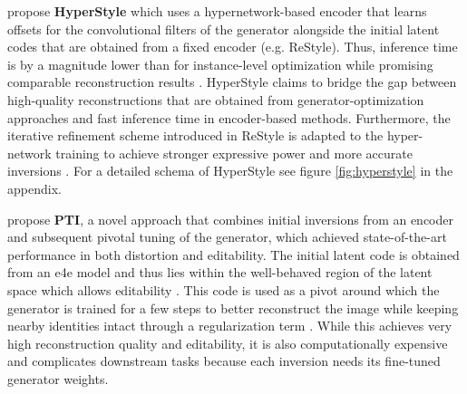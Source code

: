 \cite{alaluf2022hyperstyle} propose \textbf{HyperStyle} which uses a hypernetwork-based encoder that learns offsets for the convolutional filters of the generator alongside the initial latent codes that are obtained from a fixed encoder (e.g. ReStyle). Thus, inference time is by a magnitude lower than for instance-level optimization while promising comparable reconstruction results \citep[p.5]{alaluf2022hyperstyle}. HyperStyle claims to bridge the gap between high-quality reconstructions that are obtained from generator-optimization approaches and fast inference time in encoder-based methods. Furthermore, the iterative refinement scheme introduced in ReStyle \citep{alaluf2021restyle} is adapted to the hyper-network training to achieve stronger expressive power and more accurate inversions \citep[p.5]{alaluf2022hyperstyle}. For a detailed schema of HyperStyle see figure \ref{fig:hyperstyle} in the appendix.

\cite{roich2022pivotal} propose \textbf{PTI}, a novel approach that combines initial inversions from an encoder and subsequent pivotal tuning of the generator, which achieved state-of-the-art performance in both distortion and editability. The initial latent code is obtained from an e4e model and thus lies within the well-behaved region of the latent space which allows editability \citep[p.2]{tov2021designing}. This code is used as a pivot around which the generator is trained for a few steps to better reconstruct the image while keeping nearby identities intact through a regularization term \citep[p.1]{roich2022pivotal}. While this achieves very high reconstruction quality and editability, it is also computationally expensive and complicates downstream tasks because each inversion needs its fine-tuned generator weights. 

